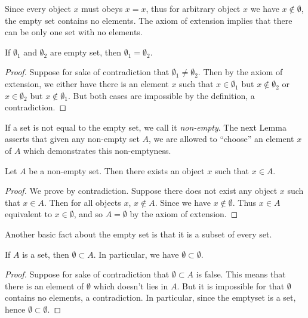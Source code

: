 Since every object $x$ must obeys $x = x$, thus for arbitrary object $x$ we have $x \notin \emptyset$, the empty set contains no elements. The axiom of extension implies that there can be only one set with no elements.

\begin{lemma}
    If $\emptyset_1$ and $\emptyset_2$ are empty set, then $\emptyset_1 = \emptyset_2$.
\end{lemma}

\begin{proof}
    Suppose for sake of contradiction that $\emptyset_1 \neq \emptyset_2$. Then by the axiom of extension, we either have there is an element $x$ such that $x \in \emptyset_1$ but $x \notin \emptyset_2$ or $x \in \emptyset_2$ but $x \notin \emptyset_1$. But both cases are impossible by the definition, a contradiction.
\end{proof}

If a set is not equal to the empty set, we call it \emph{non-empty}. The next Lemma asserts that given any non-empty set $A$, we are allowed to ``choose'' an element $x$ of $A$ which demonstrates this non-emptyness.

\begin{lemma}
    Let $A$ be a non-empty set. Then there exists an object $x$ such that $x \in A$.
\end{lemma}

\begin{proof}
    We prove by contradiction. Suppose there does not exist any object $x$ such that $x \in A$. Then for all objects $x$, $x \notin A$. Since we have $x \notin \emptyset$. Thus $x \in A$ equivalent to $x \in \emptyset$, and so $A = \emptyset$ by the axiom of extension.
\end{proof}

Another basic fact about the empty set is that it is a subset of every set.
\begin{lemma}
    If $A$ is a set, then $\emptyset \subset A$. In particular, we have $\emptyset \subset \emptyset$.
\end{lemma}

\begin{proof}
    Suppose for sake of contradiction that $\emptyset \subset A$ is false. This means that there is an element of $\emptyset$ which doesn't lies in $A$. But it is impossible for that $\emptyset$ contains no elements, a contradiction. In particular, since the emptyset is a set, hence $\emptyset \subset \emptyset$.
\end{proof}


